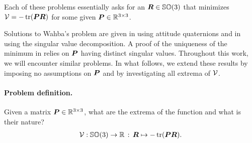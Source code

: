 Each of these problems essentially asks for an $\boldsymbol{R}\in\mathbb{SO}(3)$ that minimizes $\mathcal{V} = -\operatorname{tr}(\boldsymbol{P} \boldsymbol{R})$ for some given $\boldsymbol{P}\in\mathbb{R}^{3\times3}$.

Solutions to Wahba's problem are given in \cite{Davenport:QMethod} using attitude quaternions and in \cite{Kabsch:SSVD} using the singular value decomposition.
A proof of the uniqueness of the minimum in \cite{Bullo:TrackingAutomatica} relies on $\boldsymbol{P}$ having distinct singular values.
Throughout this work, we will encounter similar problems.
In what follows, we extend these results by imposing no assumptions on $\boldsymbol{P}$ and by investigating all extrema of $\mathcal{V}$.

\paragraph{Problem definition.}
Given a matrix $\boldsymbol{P}\in\mathbb{R}^{3\times3}$, what are the extrema of the function and what is their nature?
\begin{align}
 \mathcal{V}: \mathbb{SO}(3) \rightarrow \mathbb{R} \, : \, \boldsymbol{R} \mapsto -\operatorname{tr}(\boldsymbol{P} \boldsymbol{R}).
\end{align}


